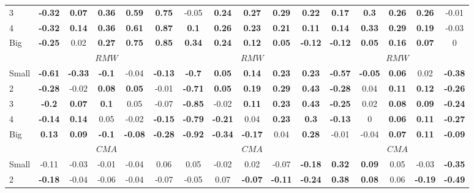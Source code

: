 \begin{table}[H]
\begin{tabular}{lccccc|ccccc|ccccc}
3 & \textbf{-0.32} & \textbf{0.07} & \textbf{0.36} & \textbf{0.59} & \textbf{0.75} & -0.05 & \textbf{0.24} & \textbf{0.27} & \textbf{0.29} & \textbf{0.22} & \textbf{0.17} & \textbf{0.3} & \textbf{0.26} & \textbf{0.26} & -0.01 \\
4 & \textbf{-0.32} & \textbf{0.14} & \textbf{0.36} & \textbf{0.61} & \textbf{0.87} & \textbf{0.1} & \textbf{0.26} & \textbf{0.23} & \textbf{0.21} & \textbf{0.11} & \textbf{0.14} & \textbf{0.33} & \textbf{0.29} & \textbf{0.19} & -0.03 \\
Big & \textbf{-0.25} & 0.02 & \textbf{0.27} & \textbf{0.75} & \textbf{0.85} & \textbf{0.34} & \textbf{0.24} & \textbf{0.12} & \textbf{0.05} & \textbf{-0.12} & \textbf{-0.12} & \textbf{0.05} & \textbf{0.16} & \textbf{0.07} & 0 \\
 & \multicolumn{5}{c|}{$RMW$} & \multicolumn{5}{c|}{$RMW$} & \multicolumn{5}{c}{$RMW$} \\
Small & \textbf{-0.61} & \textbf{-0.33} & \textbf{-0.1} & -0.04 & \textbf{-0.13} & \textbf{-0.7} & \textbf{0.05} & \textbf{0.14} & \textbf{0.23} & \textbf{0.23} & \textbf{-0.57} & \textbf{-0.05} & \textbf{0.06} & 0.02 & \textbf{-0.38} \\
2 & \textbf{-0.28} & -0.02 & \textbf{0.08} & \textbf{0.05} & -0.01 & \textbf{-0.71} & \textbf{0.05} & \textbf{0.19} & \textbf{0.29} & \textbf{0.43} & \textbf{-0.28} & 0.04 & \textbf{0.11} & \textbf{0.12} & \textbf{-0.26} \\
3 & \textbf{-0.2} & \textbf{0.07} & \textbf{0.1} & 0.05 & -0.07 & \textbf{-0.85} & -0.02 & \textbf{0.11} & \textbf{0.23} & \textbf{0.43} & \textbf{-0.25} & 0.02 & \textbf{0.08} & \textbf{0.09} & \textbf{-0.24} \\
4 & \textbf{-0.14} & \textbf{0.14} & 0.05 & -0.02 & \textbf{-0.15} & \textbf{-0.79} & \textbf{-0.21} & 0.04 & \textbf{0.23} & \textbf{0.3} & \textbf{-0.13} & 0 & \textbf{0.06} & \textbf{0.11} & \textbf{-0.27} \\
Big & \textbf{0.13} & \textbf{0.09} & \textbf{-0.1} & \textbf{-0.08} & \textbf{-0.28} & \textbf{-0.92} & \textbf{-0.34} & \textbf{-0.17} & 0.04 & \textbf{0.28} & -0.01 & -0.04 & \textbf{0.07} & \textbf{0.11} & \textbf{-0.09} \\
 & \multicolumn{5}{c|}{$CMA$} & \multicolumn{5}{c|}{$CMA$} & \multicolumn{5}{c}{$CMA$} \\
Small & -0.11 & -0.03 & -0.01 & -0.04 & 0.06 & 0.05 & -0.02 & 0.02 & -0.07 & \textbf{-0.18} & \textbf{0.32} & \textbf{0.09} & 0.05 & -0.03 & \textbf{-0.35} \\
2 & \textbf{-0.18} & -0.04 & -0.06 & -0.04 & -0.07 & -0.05 & 0.07 & \textbf{-0.07} & \textbf{-0.11} & \textbf{-0.24} & \textbf{0.38} & \textbf{0.08} & 0.06 & \textbf{-0.19} & \textbf{-0.49} \\

\end{tabular}
\end{table}
